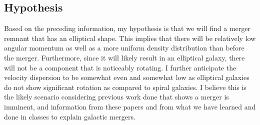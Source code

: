 \documentclass[twocolumn]{aastex631}
\begin{document}
\subsection{Hypothesis}
Based on the preceding information, my hypothesis is that we will find a merger remnant that has an elliptical shape. This implies that there will be relatively low angular momentum as well as a more uniform density distribution than before the merger. Furthermore, since it will likely result in an elliptical galaxy, there will not be a component that is noticeably rotating. I further anticipate the velocity dispersion to be somewhat even and somewhat low as elliptical galaxies do not show significant rotation as compared to spiral galaxies. I believe this is the likely scenario considering previous work done that shows a merger is imminent, and information from these papers and from what we have learned and done in classes to explain galactic mergers. 




\end{document}
